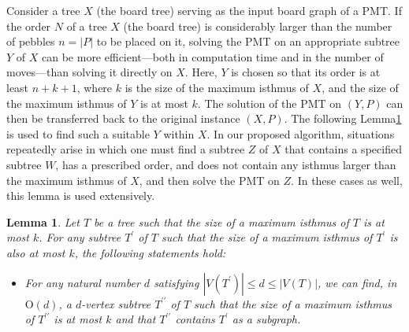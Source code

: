 \documentclass[letter,11pt]{article}
\newtheorem{la}[thm]{Lemma}
\theoremstyle{definition}
\theoremstyle{definition}
\newcommand{\1}{\boldmath$~1~$\unboldmath}
\newcommand{\Ord}{\mathrm{O}}
\newcommand{\tume}{\hspace*{0.2em}}
\begin{document}
Consider a tree $X$ (the board tree) serving as the input board graph of a PMT. 
If the order $N$ of a tree $X$ (the board tree) is considerably larger than the number of pebbles $n = |P|$ 
to be placed on it, solving the PMT on an appropriate subtree $Y$ of $X$ can be more efficient---both 
in computation time and in the number of moves---than solving it directly on $X$. Here, $Y$ is chosen 
so that its order is at least $n + k + 1$, where $k$ is the size of the maximum isthmus of $X$, and 
the size of the maximum isthmus of $Y$ is at most $k$. The solution of the PMT on $(Y, P)$ can 
then be transferred back to the original instance $(X, P)$. 
The following Lemma\tume\ref{feasible-subtree} is used to find such a suitable $Y$ within $X$. 
In our proposed algorithm, situations repeatedly arise in which one must find a subtree $Z$ of $X$ 
that contains a specified subtree $W$, has a prescribed order, and does not contain any isthmus 
larger than the maximum isthmus of $X$, and then solve the PMT on $Z$. In these cases as well, 
this lemma is used extensively. 
\begin{la}\label{feasible-subtree}
Let $T$ be a tree such that the size of a maximum isthmus of $T$ is at most $k$. 
For any subtree $T^{\prime}$ of $T$ such that the size of a maximum isthmus of $T^{\prime}$ is also at most $k$, the following statements hold:
\begin{itemize}
\item For any natural number $d$ satisfying $|V(T^{\prime})| \leq d \leq |V(T)|$, 
we can find, in $\Ord(d)$, a $d$-vertex subtree $T^{\prime\prime}$ of $T$ such that the size of a maximum isthmus 
of $T^{\prime\prime}$ is at most $k$ and that $T^{\prime\prime}$ contains $T^{\prime}$ 
as a subgraph.
\end{itemize}
\end{la}
\end{document}
